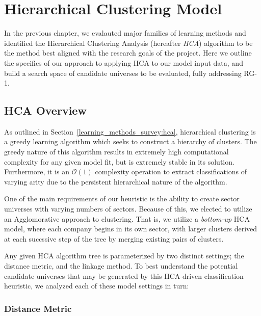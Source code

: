 \documentclass[../main.tex]{subfiles}
\begin{document}
\chapter{Hierarchical Clustering Model} \label{hierarchical_clustering_model}




In the previous chapter, we evalauted major families of learning methods and identified the Hierarchical Clustering Analysis (hereafter \textit{HCA}) algorithm to be the method best aligned with the research goals of the project. Here we outline the specifics of our approach to applying HCA to our model input data, and build a search space of candidate universes to be evaluated, fully addressing RG-1.

\section{HCA Overview}

As outlined in Section~\ref{learning_methods_survey:hca}, hierarchical clustering is a greedy learning algorithm which seeks to construct a hierarchy of clusters. The greedy nature of this algorithm results in extremely high computational complexity for any given model fit, but is extremely stable in its solution. Furthermore, it is an $\mathcal{O}(1)$ complexity operation to extract classifications of varying arity due to the persistent hierarchical nature of the algorithm.

One of the main requirements of our heuristic is the ability to create sector universes with varying numbers of sectors. Because of this, we elected to utilize an Agglomorative approach to clustering. That is, we utilize a \textit{bottom-up} HCA model, where each company begins in its own sector, with larger clusters derived at each succssive step of the tree by merging existing pairs of clusters.

Any given HCA algorithm tree is parameterized by two distinct settings; the distance metric, and the linkage method. To best understand the potential candidate universes that may be generated by this HCA-driven classification heuristic, we analyzed each of these model settings in turn:

\subsection{Distance Metric}
\end{document}
